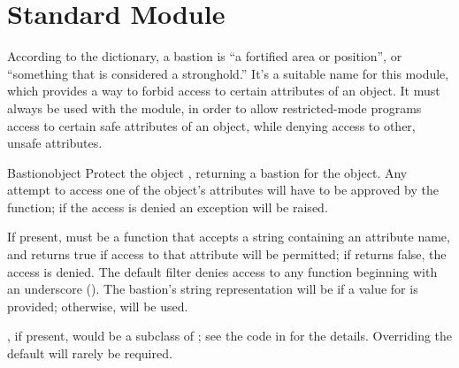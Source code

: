 \section{Standard Module }
\label{module-Bastion}


According to the dictionary, a bastion is ``a fortified area or
position'', or ``something that is considered a stronghold.''  It's a
suitable name for this module, which provides a way to forbid access
to certain attributes of an object.  It must always be used with the
 module, in order to allow restricted-mode programs access
to certain safe attributes of an object, while denying access to
other, unsafe attributes.


\begin{funcdesc}{Bastion}{object}
Protect the object , returning a bastion for the
object.  Any attempt to access one of the object's attributes will
have to be approved by the  function; if the access is
denied an  exception will be raised.

If present,  must be a function that accepts a string
containing an attribute name, and returns true if access to that
attribute will be permitted; if  returns false, the access
is denied.  The default filter denies access to any function beginning
with an underscore (\samp{_}).  The bastion's string representation
will be  if a value for
 is provided; otherwise,  will be
used.

, if present, would be a subclass of ;
see the code in  for the details.  Overriding the
default  will rarely be required.

\end{funcdesc}
